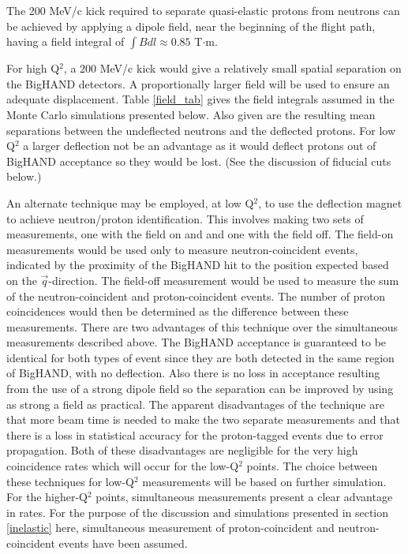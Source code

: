 \documentclass[12pt,letterpaper,oneside]{article}
\begin{document}


The 200 MeV/c kick required to separate quasi-elastic protons from
neutrons can be achieved by applying a dipole field, near the beginning
of the flight path, having a field integral of 
$\int{B dl}\approx 0.85$ T$\cdot$m.

For high Q$^2$, a 200 MeV/c kick would give a relatively small spatial
separation on the BigHAND detectors.  A proportionally larger field
will be used to ensure an adequate displacement. Table \ref{field_tab}
gives the field integrals assumed in the Monte Carlo simulations
presented below.  Also given are the resulting mean separations
between the undeflected neutrons and the deflected protons.  For low
Q$^2$ a larger deflection not be an advantage as it would deflect
protons out of BigHAND acceptance so they would be lost.  (See the
discussion of fiducial cuts below.)  

An alternate technique may be employed, at low Q$^2$, to use the 
deflection magnet to achieve neutron/proton identification.   This involves
making two sets of measurements, one with the field on and and one
with the field off.  The field-on measurements would be used only to
measure neutron-coincident events, 
indicated by the proximity of the BigHAND hit to the
position expected based on the $\vec{q}$-direction.  The field-off measurement
would be used to measure the sum of the  neutron-coincident and
proton-coincident events.
The number of proton coincidences would then be determined as the difference
between these measurements. There are two advantages of this technique over the
simultaneous measurements described above.  The BigHAND
acceptance is guaranteed to be identical for both types of event since
they are both detected in the same region of BigHAND, with no deflection.
Also there is no loss in acceptance resulting from the use of a 
strong dipole field so the separation can be improved by using as
strong a field as practical.  The apparent disadvantages of the technique are
that more beam time is needed to make the two separate measurements
and that there is a loss in statistical accuracy for the proton-tagged
events due to error propagation.  Both of these disadvantages are
negligible for the very high coincidence rates which will occur for
the low-Q$^2$ points.  The choice between these techniques for 
low-Q$^2$ measurements will be based on further simulation.  For the
higher-Q$^2$ points, simultaneous measurements present a clear
advantage in rates.  For the purpose of the discussion and 
simulations presented in section \ref{inelastic}
here, simultaneous measurement of proton-coincident and
neutron-coincident events have been assumed.
\end{document}
